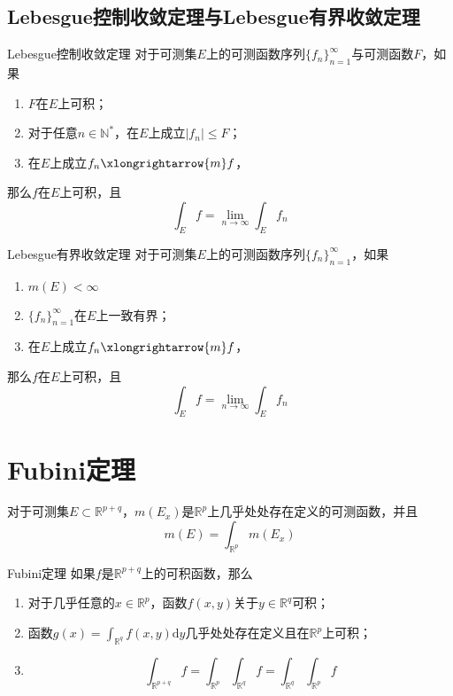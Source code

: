 \documentclass[lang = cn, scheme = chinese, thmcnt = section]{elegantbook}
\newcommand{\N}{\mathbb{N}}            %
\newcommand{\R}{\mathbb{R}}            %
\newcommand{\sub}{\subset}             %
\newcommand{\dd}{\mathrm{d}}           %
\newcommand{\tom}{\xlongrightarrow{m}}
\begin{document}
\subsection{Lebesgue控制收敛定理与Lebesgue有界收敛定理}

\begin{theorem}{Lebesgue控制收敛定理}
	对于可测集$E$上的可测函数序列$\{ f_n \}_{n=1}^{\infty}$与可测函数$F$，如果
	\begin{enumerate}
		\item $F$在$E$上可积；
		\item 对于任意$n\in\N^*$，在$E$上成立$|f_n|\le F$；
		\item 在$E$上成立$f_n\tom f$，
	\end{enumerate}
	那么$f$在$E$上可积，且
	$$
	\int_Ef=\lim_{n\to\infty}\int_Ef_n
	$$
\end{theorem}

\begin{theorem}{Lebesgue有界收敛定理}
	对于可测集$E$上的可测函数序列$\{ f_n \}_{n=1}^{\infty}$，如果
	\begin{enumerate}
		\item $m(E)<\infty$
		\item $\{ f_n \}_{n=1}^{\infty}$在$E$上一致有界；
		\item 在$E$上成立$f_n\tom f$，
	\end{enumerate}
	那么$f$在$E$上可积，且
	$$
	\int_Ef=\lim_{n\to\infty}\int_Ef_n
	$$
\end{theorem}

\section{Fubini定理}

\begin{lemma}
	对于可测集$E\sub\R^{p+q}$，$m(E_x)$是$\R^p$上几乎处处存在定义的可测函数，并且
	$$
	m(E)=\int_{\R^p}m(E_x)
	$$
\end{lemma}

\begin{theorem}{Fubini定理}
	如果$f$是$\R^{p+q}$上的可积函数，那么
	\begin{enumerate}
		\item 对于几乎任意的$x\in\R^p$，函数$f(x,y)$关于$y\in\R^q$可积；
		\item 函数$g(x)=\displaystyle\int_{\R^q}f(x,y)\dd y$几乎处处存在定义且在$\R^p$上可积；
		\item 
		$$
		\int_{\R^{p+q}}f=\int_{\R^p}\int_{\R^q}f=\int_{\R^q}\int_{\R^p}f
		$$
	\end{enumerate}
\end{theorem}
\end{document}
